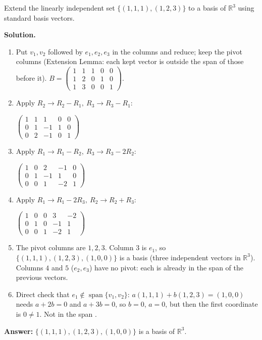 \documentclass[11pt]{article}
\begin{document}
\begin{tcolorbox}[breakable,colback=white,colframe=ink!60,title={\bfseries Example 5 \textperiodcentered\ Extending an independent set to a basis}]Extend the linearly independent set $\{(1,1,1),(1,2,3)\}$ to a basis of $\mathbb{R}^{3}$ using standard basis vectors.
\par\smallskip
\textbf{Solution.} \begin{enumerate}[leftmargin=1.6em,itemsep=1pt,topsep=2pt,label=\arabic*.]\item Put $v_1,v_2$ followed by $e_1,e_2,e_3$ in the columns and reduce; keep the pivot columns (Extension Lemma: each kept vector is outside the span of those before it). $B=\left(\begin{array}{cc|ccc}1 & 1 & 1 & 0 & 0 \\ 1 & 2 & 0 & 1 & 0 \\ 1 & 3 & 0 & 0 & 1\end{array}\right)$.
\item Apply $R_2\to R_2-R_1,\ R_3\to R_3-R_1$:\par\smallskip $\displaystyle \left(\begin{array}{cc|ccc}1 & 1 & 1 & 0 & 0 \\ 0 & 1 & -1 & 1 & 0 \\ 0 & 2 & -1 & 0 & 1\end{array}\right)$
\item Apply $R_1\to R_1-R_2,\ R_3\to R_3-2R_2$:\par\smallskip $\displaystyle \left(\begin{array}{cc|ccc}1 & 0 & 2 & -1 & 0 \\ 0 & 1 & -1 & 1 & 0 \\ 0 & 0 & 1 & -2 & 1\end{array}\right)$
\item Apply $R_1\to R_1-2R_3,\ R_2\to R_2+R_3$:\par\smallskip $\displaystyle \left(\begin{array}{cc|ccc}1 & 0 & 0 & 3 & -2 \\ 0 & 1 & 0 & -1 & 1 \\ 0 & 0 & 1 & -2 & 1\end{array}\right)$
\item The pivot columns are $1,2,3$. Column $3$ is $e_1$, so $\{(1,1,1),(1,2,3),(1,0,0)\}$ is a basis (three independent vectors in $\mathbb{R}^{3}$). Columns $4$ and $5$ ($e_2,e_3$) have no pivot: each is already in the span of the previous vectors.
\item Direct check that $e_1\notin\operatorname{span}\{v_1,v_2\}$: $a(1,1,1)+b(1,2,3)=(1,0,0)$ needs $a+2b=0$ and $a+3b=0$, so $b=0$, $a=0$, but then the first coordinate is $0\neq1$. Not in the span \checkmark.
\end{enumerate}\textbf{Answer:} $\{(1,1,1),(1,2,3),(1,0,0)\}$ is a basis of $\mathbb{R}^{3}$.
\end{tcolorbox}
\end{document}
